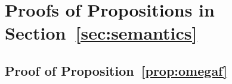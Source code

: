 \section{Proofs of Propositions in Section~\ref{sec:semantics}}
\label{app:semantics_proofs}







\subsection{Proof of Proposition~\ref{prop:omegaf}}
\label{app:proof:omegaf}

